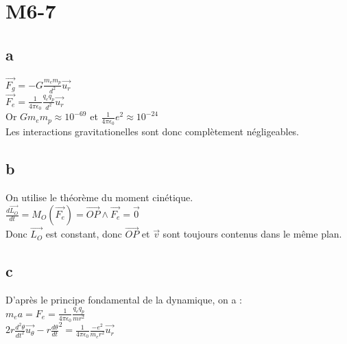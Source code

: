 \documentclass[11pt,a4paper]{article}
\begin{document}
\tableofcontents

\section{M6-7}

\subsection{a}

$\overrightarrow{F_g}=-G\frac{m_em_p}{d^2}\overrightarrow{u_r}$\\
$\overrightarrow{F_e}=\frac{1}{4\pi\epsilon_0}\frac{q_eq_p}{d^2}\overrightarrow{u_r}$\\
Or $Gm_em_p\approx10^{-69}$ et $\frac{1}{4\pi\epsilon_0}e^2\approx10^{-24}$\\
Les interactions gravitationelles sont donc complètement négligeables.

\subsection{b}

On utilise le théorème du moment cinétique.\\
$\frac{d\overrightarrow{L_O}}{dt}=M_O(\overrightarrow{F_e})=\overrightarrow{OP}\wedge\overrightarrow{F_e}=\overrightarrow{0}$\\
Donc $\overrightarrow{L_O}$ est constant, donc $\overrightarrow{OP}$ et $\overrightarrow{v}$ sont toujours contenus dans le même plan.

\subsection{c}

D'après le principe fondamental de la dynamique, on a :\\
$m_ea=F_e=\frac{1}{4\pi\epsilon_0}\frac{q_eq_p}{mr^2}$\\
$2r\frac{d^2\theta}{dt^2}\overrightarrow{u_\theta}-r\frac{d\theta}{dt}^2=\frac{1}{4\pi\epsilon_0}\frac{-e^2}{m_er^2}\overrightarrow{u_r}$\\
\end{document}
